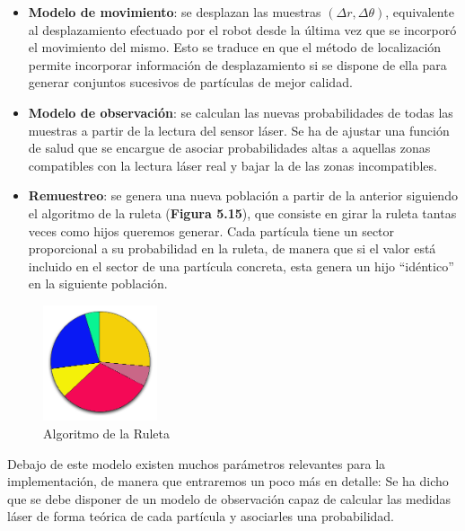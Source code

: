 \begin{itemize}
	\item \textbf{ Modelo de movimiento}: se desplazan las muestras $(\Delta r, \Delta\theta)$, equivalente al desplazamiento efectuado por el robot desde la última vez que se incorporó el movimiento del mismo. Esto se traduce en que el método de localización permite incorporar información de desplazamiento si se dispone de ella para generar conjuntos sucesivos de partículas de mejor calidad. 
	\item \textbf{Modelo de observación}: se calculan las nuevas probabilidades de todas las muestras a partir de la lectura del sensor láser. Se ha de ajustar una función de salud que se encargue de asociar probabilidades altas a aquellas zonas compatibles con la lectura láser real y bajar la de las zonas incompatibles. 
	\item \textbf{Remuestreo}: se genera una nueva población a partir de la anterior siguiendo el algoritmo de la ruleta (\textbf{Figura 5.15}), que consiste en girar la ruleta tantas veces como hijos queremos generar. Cada partícula tiene un sector proporcional a su probabilidad en la ruleta, de manera que si el valor está incluido en el sector de una partícula concreta, esta genera un hijo “idéntico” en la siguiente población.
\end{itemize}

\begin{figure}[H]
	\begin{center}
		\includegraphics[width=0.3\textwidth]{figures/ruleta.png}
		\caption{Algoritmo de la Ruleta}
		\label{fig.ruleta}
		\end{center}
\end{figure}

Debajo de este modelo existen muchos parámetros relevantes para la implementación, de manera que entraremos un poco más en detalle: 
Se ha dicho que se debe disponer de un modelo de observación capaz de calcular las medidas láser de forma teórica de cada partícula y asociarles una probabilidad.

